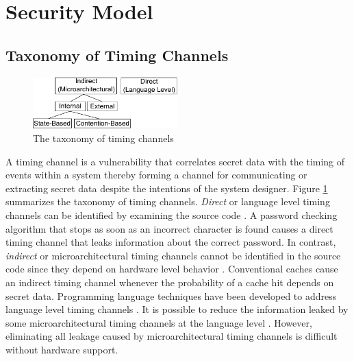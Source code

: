 \section{Security Model}
\subsection{Taxonomy of Timing Channels}
    \begin{figure}
        \begin{center}
            \includegraphics[width=2.2in]{figs/taxonomy.pdf}
            \caption{The taxonomy of timing channels}
            \label{fig:taxonomy}
        \end{center}
    \end{figure}

A timing channel is a vulnerability that correlates secret data with the  
timing of events within a system thereby forming a channel for communicating or 
extracting secret data despite the intentions of the system designer. Figure 
\ref{fig:taxonomy} summarizes the taxonomy of timing channels. \emph{Direct} or 
language level timing channels can be identified by examining the source code 
\cite{mitigation3}. A password checking algorithm that stops as soon as an 
incorrect character is found causes a direct timing channel that leaks 
information about the correct password. In contrast, \emph{indirect} or 
microarchitectural timing channels cannot be identified in the source code 
since they depend on hardware level behavior \cite{mitigation3}. Conventional 
caches cause an indirect timing channel whenever the probability of a cache hit 
depends on secret data. Programming language techniques have been developed to 
address language level timing channels 
\cite{timesens,mitigation1,mitigation2,mitigation3}. It is possible to reduce 
the information leaked by some microarchitectural timing channels at the 
language level \cite{mitigation3}. However, eliminating all leakage caused by 
microarchitectural timing channels is difficult without hardware support.

